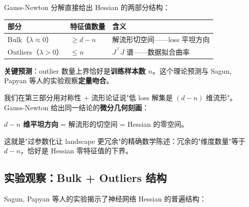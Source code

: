 \documentclass[12pt, a4paper]{ctexart}
\begin{document}
\begin{keypoint}
Gauss-Newton 分解直接给出 Hessian 的两部分结构：

\begin{center}
\renewcommand{\arraystretch}{1.4}
\begin{tabular}{lll}
\toprule
\textbf{部分} & \textbf{特征值数量} & \textbf{含义} \\ \midrule
Bulk（$\lambda \approx 0$）& $\geq d - n$ & 解流形切空间——loss 平坦方向 \\
Outliers（$\lambda > 0$）& $\leq n$ & $J^\top J$ 谱——数据拟合曲率 \\
\bottomrule
\end{tabular}
\end{center}

\textbf{关键预测}：outlier 数量上界恰好是\textbf{训练样本数 $n$}。这个理论预测与 Sagun, Papyan 等人的实验观察\textbf{定量吻合}。
\end{keypoint}

\begin{insight}[与第三部分的呼应]
我们在第三部分用对称性 + 流形论证说"低 loss 解集是 $(d-n)$ 维流形"。Gauss-Newton 给出同一结论的\textbf{微分几何刻画}：

\textbf{$d - n$ 维平坦方向} = 解流形的切空间 = Hessian 的零空间。

这就是"过参数化让 landscape 更冗余"的精确数学陈述：冗余的"维度数量"等于 $d - n$，恰好是 Hessian 零特征值的下界。
\end{insight}

\subsection{实验观察：Bulk + Outliers 结构}

Sagun, Papyan 等人的实验揭示了神经网络 Hessian 的普遍结构：
\end{document}
